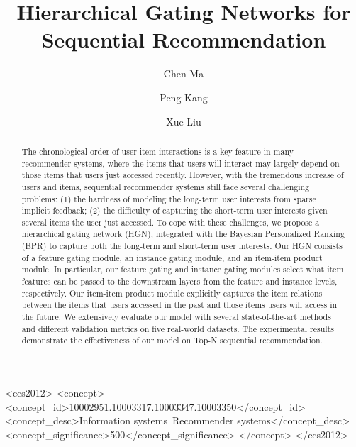 \documentclass[sigconf]{acmart}
\begin{document}
\title{Hierarchical Gating Networks for Sequential Recommendation}

\author{Chen Ma}

\author{Peng Kang}

\author{Xue Liu}


\begin{abstract}
The chronological order of user-item interactions is a key feature in many recommender systems, where the items that users will interact may largely depend on those items that users just accessed recently. However, with the tremendous increase of users and items, sequential recommender systems still face several challenging problems: (1) the hardness of modeling the long-term user interests from sparse implicit feedback; (2) the difficulty of capturing the short-term user interests given several items the user just accessed. To cope with these challenges, we propose a hierarchical gating network (HGN), integrated with the Bayesian Personalized Ranking (BPR) to capture both the long-term and short-term user interests. Our HGN consists of a feature gating module, an instance gating module, and an item-item product module. In particular, our feature gating and instance gating modules select what item features can be passed to the downstream layers from the feature and instance levels, respectively. Our item-item product module explicitly captures the item relations between the items that users accessed in the past and those items users will access in the future. We extensively evaluate our model with several state-of-the-art methods and different validation metrics on five real-world datasets. The experimental results demonstrate the effectiveness of our model on Top-N sequential recommendation.
\end{abstract}

\begin{CCSXML}
<ccs2012>
<concept>
<concept_id>10002951.10003317.10003347.10003350</concept_id>
<concept_desc>Information systems~Recommender systems</concept_desc>
<concept_significance>500</concept_significance>
</concept>
</ccs2012>
\end{CCSXML}
\end{document}
